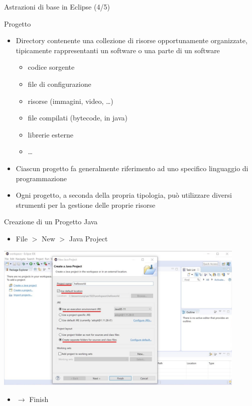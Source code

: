 \documentclass[presentation]{beamer}
\begin{document}
\begin{frame}{Astrazioni di base in Eclipse (4/5)}
\begin{block}{Progetto}
\begin{itemize}
\item Directory contenente una collezione di risorse opportunamente organizzate, tipicamente rappresentanti un software o una parte di un software
\begin{itemize}
\item codice sorgente
\item file di configurazione
\item risorse (immagini, video, \dots)
\item file compilati (bytecode, in java)
\item librerie esterne
\item \dots
\end{itemize}
\item Ciascun progetto fa generalmente riferimento ad uno specifico linguaggio di programmazione
\item Ogni progetto, a seconda della propria tipologia, può utilizzare diversi strumenti per la gestione delle proprie risorse
\end{itemize}
\end{block}
\end{frame}

\begin{frame}{Creazione di un Progetto Java}
\begin{itemize}
\item File $>$ New $>$ Java Project
\end{itemize}
\begin{center}
\includegraphics[width=0.9\textwidth]{img/eclipse-screenshots/eclipse-ide-02a.jpg}
\end{center}
\begin{itemize}
\item $\rightarrow$ Finish
\end{itemize}
\end{frame}
\end{document}
